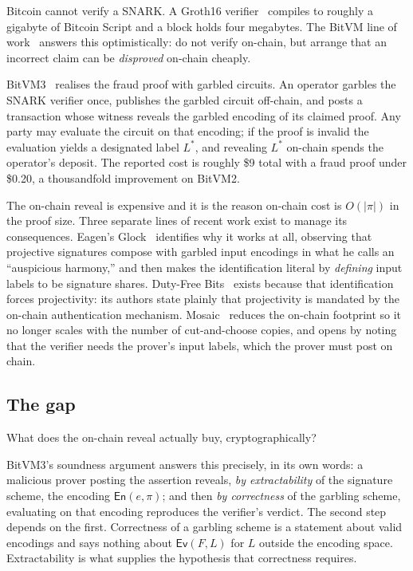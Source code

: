 \documentclass[11pt,a4paper]{article}
\theoremstyle{definition}
\theoremstyle{plain}
\newcommand{\En}{\mathsf{En}}
\newcommand{\Ev}{\mathsf{Ev}}
\begin{document}
Bitcoin cannot verify a SNARK. A Groth16 verifier~\cite{Groth16} compiles to
roughly a gigabyte of Bitcoin Script and a block holds four megabytes. The
BitVM line of work~\cite{BitVM1,BitVM2,BitVM3} answers this optimistically: do
not verify on-chain, but arrange that an incorrect claim can be
\emph{disproved} on-chain cheaply.

BitVM3~\cite{BitVM3} realises the fraud proof with garbled circuits. An operator
garbles the SNARK verifier once, publishes the garbled circuit off-chain, and
posts a transaction whose witness reveals the garbled encoding of its claimed
proof. Any party may evaluate the circuit on that encoding; if the proof is
invalid the evaluation yields a designated label $L^{*}$, and revealing $L^{*}$
on-chain spends the operator's deposit. The reported cost is roughly \$9 total
with a fraud proof under \$0.20, a thousandfold improvement on BitVM2.

The on-chain reveal is expensive and it is the reason on-chain cost is $O(|\pi|)$
in the proof size. Three separate lines of recent work exist to manage its
consequences. Eagen's Glock~\cite{Glock} identifies why it works at all,
observing that projective signatures compose with garbled input encodings in
what he calls an ``auspicious harmony,'' and then makes the identification
literal by \emph{defining} input labels to be signature shares. Duty-Free
Bits~\cite{DutyFreeBits} exists because that identification forces projectivity:
its authors state plainly that projectivity is mandated by the on-chain
authentication mechanism. Mosaic~\cite{Mosaic} reduces the on-chain footprint so
it no longer scales with the number of cut-and-choose copies, and opens by
noting that the verifier needs the prover's input labels, which the prover must
post on chain.

\subsection*{The gap}

What does the on-chain reveal actually buy, cryptographically?

BitVM3's soundness argument answers this precisely, in its own words: a
malicious prover posting the assertion reveals, \emph{by extractability} of the
signature scheme, the encoding $\En(e,\pi)$; and then \emph{by correctness} of
the garbling scheme, evaluating on that encoding reproduces the verifier's
verdict. The second step depends on the first. Correctness of a garbling scheme
is a statement about valid encodings and says nothing about $\Ev(F, L)$ for $L$
outside the encoding space. Extractability is what supplies the hypothesis that
correctness requires.
\end{document}

